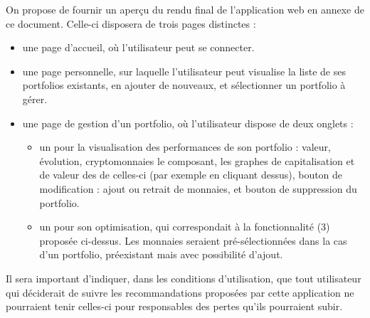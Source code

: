 \documentclass[a4paper]{article}
\begin{document}
On propose de fournir un aperçu du rendu final de l'application web en annexe de ce document. Celle-ci disposera de trois pages distinctes :
\begin{itemize}
    \item une page d'accueil, où l'utilisateur peut se connecter.
    \item une page personnelle, sur laquelle l'utilisateur peut visualise la liste de ses portfolios existants, en ajouter de nouveaux, et sélectionner un portfolio à gérer.
    \item une page de gestion d'un portfolio, où l'utilisateur dispose de deux onglets :
    \begin{itemize}
        \item un pour la visualisation des performances de son portfolio : valeur, évolution, cryptomonnaies le composant, les graphes de capitalisation et de valeur des de celles-ci (par exemple en cliquant dessus), bouton de modification : ajout ou retrait de monnaies, et bouton de suppression du portfolio.
        \item un pour son optimisation, qui correspondait à la fonctionnalité (3) proposée ci-dessus. Les monnaies seraient pré-sélectionnées dans la cas d'un portfolio, préexistant mais avec possibilité d'ajout.
    \end{itemize}
\end{itemize}\medskip

Il sera important d'indiquer, dans les conditions d'utilisation, que tout utilisateur qui déciderait de suivre les recommandations proposées par cette application ne pourraient tenir celles-ci pour responsables des pertes qu'ils pourraient subir.

\printbibliography
\end{document}

